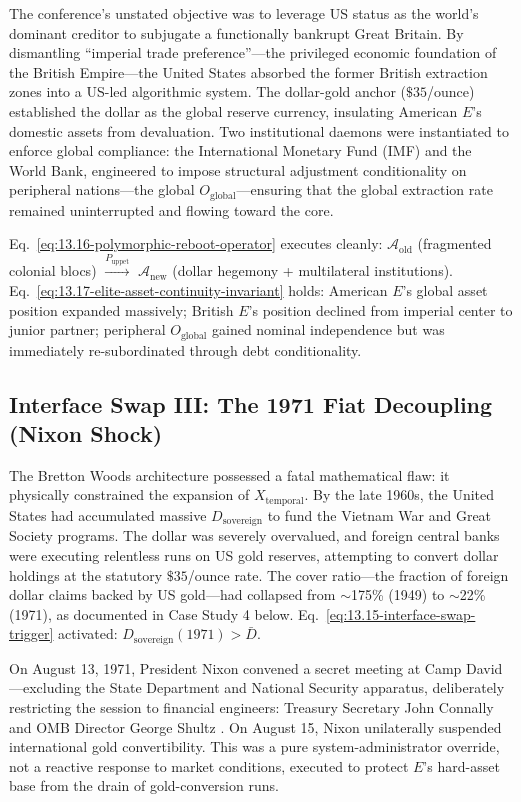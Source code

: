 The conference's unstated objective was to leverage US status as the world's dominant creditor to subjugate a functionally bankrupt Great Britain. By dismantling ``imperial trade preference''---the privileged economic foundation of the British Empire---the United States absorbed the former British extraction zones into a US-led algorithmic system. The dollar-gold anchor ($\$35$/ounce) established the dollar as the global reserve currency, insulating American $E$'s domestic assets from devaluation. Two institutional daemons were instantiated to enforce global compliance: the International Monetary Fund (IMF) and the World Bank, engineered to impose structural adjustment conditionality on peripheral nations---the global $O_{\text{global}}$---ensuring that the global extraction rate remained uninterrupted and flowing toward the core.

Eq.~\eqref{eq:13.16-polymorphic-reboot-operator} executes cleanly: $\mathcal{A}_{\text{old}}$ (fragmented colonial blocs) $\xrightarrow{P_{\text{uppet}}}$ $\mathcal{A}_{\text{new}}$ (dollar hegemony + multilateral institutions). Eq.~\eqref{eq:13.17-elite-asset-continuity-invariant} holds: American $E$'s global asset position expanded massively; British $E$'s position declined from imperial center to junior partner; peripheral $O_{\text{global}}$ gained nominal independence but was immediately re-subordinated through debt conditionality.

\subsection*{Interface Swap III: The 1971 Fiat Decoupling (Nixon Shock)}
\label{subsec:swap_1971}

The Bretton Woods architecture possessed a fatal mathematical flaw: it physically constrained the expansion of $X_{\text{temporal}}$. By the late 1960s, the United States had accumulated massive $D_{\text{sovereign}}$ to fund the Vietnam War and Great Society programs. The dollar was severely overvalued, and foreign central banks were executing relentless runs on US gold reserves, attempting to convert dollar holdings at the statutory $\$35$/ounce rate. The cover ratio---the fraction of foreign dollar claims backed by US gold---had collapsed from $\sim$175\% (1949) to $\sim$22\% (1971), as documented in Case Study 4 below. Eq.~\eqref{eq:13.15-interface-swap-trigger} activated: $D_{\text{sovereign}}(1971) > \bar{D}$.

On August 13, 1971, President Nixon convened a secret meeting at Camp David---excluding the State Department and National Security apparatus, deliberately restricting the session to financial engineers: Treasury Secretary John Connally and OMB Director George Shultz \cite{gowa_1983}. On August 15, Nixon unilaterally suspended international gold convertibility. This was a pure system-administrator override, not a reactive response to market conditions, executed to protect $E$'s hard-asset base from the drain of gold-conversion runs.

